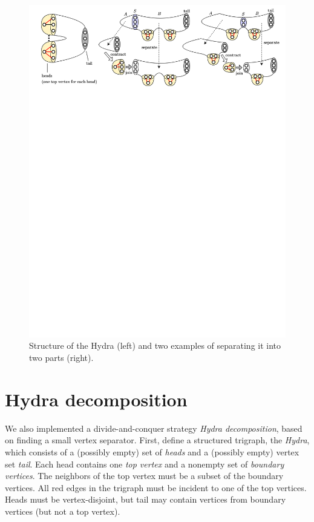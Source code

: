 \documentclass[a4paper,UKenglish,cleveref, autoref, thm-restate]{lipics-v2021}
\begin{document}
\begin{figure}[t!]
    \centering
    \includegraphics[clip,width=1.0\textwidth,trim={80 3300 80 0}]{images/decomp.png}
    \caption{Structure of the Hydra (left) and
    two examples of separating it into two parts (right).
    }
    \label{fig:decomp} 
\end{figure}

\section{Hydra decomposition}

We also implemented a divide-and-conquer strategy \emph{Hydra decomposition},
based on finding a small vertex separator.
%
First, define a structured trigraph, the \emph{Hydra},
which consists of a (possibly empty) set of \emph{heads} and
a (possibly empty) vertex set \emph{tail}.
%
Each head contains one \emph{top vertex} and a nonempty set of \emph{boundary vertices}.
The neighbors of the top vertex must be a subset of the boundary vertices.
All red edges in the trigraph must be incident to one of the top vertices.
Heads must be vertex-disjoint, but tail may contain vertices from boundary vertices
(but not a top vertex).
\end{document}
